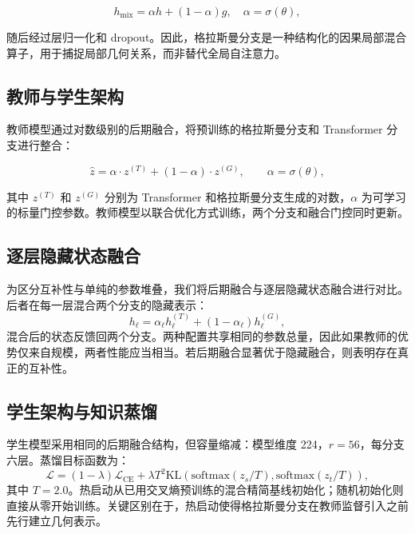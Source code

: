 \documentclass[conference]{IEEEtran}
\begin{document}
\begin{equation}
h_{\mathrm{mix}} = \alpha h + (1-\alpha) g,\quad \alpha = \sigma(\theta),
\label{eq:gate}
\end{equation}

随后经过层归一化和 dropout。因此，格拉斯曼分支是一种结构化的因果局部混合算子，用于捕捉局部几何关系\cite{bronstein2021geometric}，而非替代全局自注意力。

\subsection{教师与学生架构}

教师模型通过对数级别的后期融合，将预训练的格拉斯曼分支和 Transformer 分支进行整合：

\begin{equation}
\hat{z} = \alpha \cdot z^{(T)} + (1-\alpha) \cdot z^{(G)},
\qquad \alpha = \sigma(\theta),
\label{eq:fusion}
\end{equation}

其中 $z^{(T)}$ 和 $z^{(G)}$ 分别为 Transformer 和格拉斯曼分支生成的对数，$\alpha$ 为可学习的标量门控参数。教师模型以联合优化方式训练，两个分支和融合门控同时更新。

\subsection{逐层隐藏状态融合}
为区分互补性与单纯的参数堆叠，我们将后期融合与逐层隐藏状态融合进行对比。后者在每一层混合两个分支的隐藏表示：
\begin{equation}
h_{\ell} = \alpha_{\ell} h_{\ell}^{(T)} + (1-\alpha_{\ell}) h_{\ell}^{(G)},
\end{equation}
混合后的状态反馈回两个分支。两种配置共享相同的参数总量，因此如果教师的优势仅来自规模，两者性能应当相当。若后期融合显著优于隐藏融合，则表明存在真正的互补性。

\subsection{学生架构与知识蒸馏}
学生模型采用相同的后期融合结构，但容量缩减：模型维度 224，$r=56$，每分支六层。蒸馏目标函数为：
\begin{equation}
\mathcal{L} = (1-\lambda) \mathcal{L}_{\mathrm{CE}} + \lambda T^2 \mathrm{KL}\!\left(
\mathrm{softmax}(z_s / T), \mathrm{softmax}(z_t / T) \right),
\label{eq:kd}
\end{equation}
其中 $T = 2.0$。热启动从已用交叉熵预训练的混合精简基线初始化；随机初始化则直接从零开始训练\cite{gou2021knowledge}。关键区别在于，热启动使得格拉斯曼分支在教师监督引入之前先行建立几何表示\cite{mobahi2020self,passalis2020information}。
\end{document}
